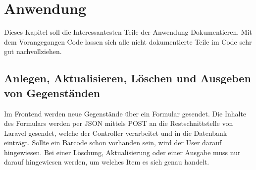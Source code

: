 \chapter{Anwendung}
Dieses Kapitel soll die Interessantesten Teile der Anwendung Dokumentieren. Mit dem Vorangegangen Code lassen sich alle nicht dokumentierte Teile im Code sehr gut nachvollziehen.



\section{Anlegen, Aktualisieren, Löschen und Ausgeben von Gegenständen}
Im Frontend werden neue Gegenstände über ein Formular gesendet. Die Inhalte des Formulars werden per \ac{JSON} mittels POST an die Restschnittstelle von Laravel gesendet, welche der Controller verarbeitet und in die Datenbank einträgt. Sollte ein Barcode schon vorhanden sein, wird der User darauf hingewiesen. Bei einer Löschung, Aktualisierung oder einer Ausgabe muss nur darauf hingewiesen werden, um welches Item es sich genau handelt.

